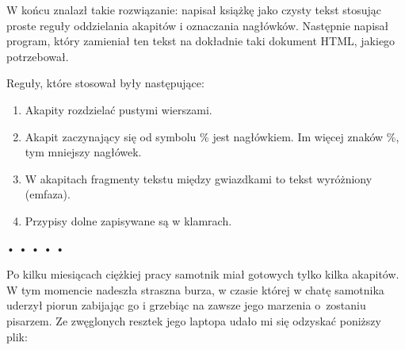   
W końcu znalazł takie rozwiązanie: napisał książkę jako czysty tekst stosując proste reguły oddzielania akapitów i oznaczania nagłówków. Następnie napisał program, który zamieniał ten tekst na dokładnie taki dokument HTML, jakiego potrzebował.

  
Reguły, które stosował były następujące:

  \begin{enumerate}
    \item Akapity rozdzielać pustymi wierszami.
    \item Akapit zaczynający się od symbolu \% jest nagłówkiem. Im więcej znaków \%, tym mniejszy nagłówek.
    \item W akapitach fragmenty tekstu między gwiazdkami to tekst wyróżniony (emfaza).
    \item Przypisy dolne zapisywane są w klamrach.
  \end{enumerate}


\begin{center}
• • • • •
\end{center}

  
Po kilku miesiącach ciężkiej pracy samotnik miał gotowych tylko kilka akapitów. W tym momencie nadeszła straszna burza, w czasie której w chatę samotnika uderzył piorun zabijając go i grzebiąc na zawsze jego marzenia o~zostaniu pisarzem. Ze zwęglonych resztek jego laptopa udało mi się odzyskać poniższy plik:

